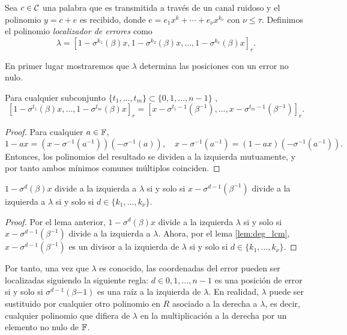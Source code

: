 Sea \(c \in \mathcal{C}\) una palabra que es transmitida a través de un canal ruidoso y el polinomio \(y = c + e\) es recibido, donde \(e = e_1 x^k + \cdots + e_\nu x^{k_\nu}\) con \(\nu \leq \tau\). Definimos el polinomio \textit{localizador de errores} como
\[
\lambda = {\left[1 - \sigma^{k_1}(\beta)x, 1 - \sigma^{k_2}(\beta)x, \dots, 1 - \sigma^{k_\nu}(\beta)x\right]}_r
.\]

En primer lugar mostraremos que \(\lambda\) determina las posiciones con un error no nulo.

\begin{lemma}\label{lem:lambda_roots}
    Para cualquier subconjunto \(\{t_1, \dots, t_m\} \subset \{0, 1, \dots, n-1\}\) ,
    \[
    {\left[1 -\sigma^{t_1}(\beta)x, \dots, 1 - \sigma^{t_m}(\beta)x \right]}_r
    = {\left[x - \sigma^{t_1 - 1}(\beta^{-1}), \dots, x - \sigma^{t_m -1}(\beta^{-1})\right]}_r
    .\]
\end{lemma}

\begin{proof}
    Para cualquier \(a \in \mathbb{F}\),
    \[
    1 - ax = (x - \sigma^{-1}(a^{-1}))(- \sigma^{-1}(a)),\quad
    x - \sigma^{-1}(a^{-1}) = (1 - ax)(-\sigma^{-1}(a^{-1})).
    \]
    Entonces, los polinomios del resultado se dividen a la izquierda mutuamente, y por tanto ambos mínimos comunes múltiplos coinciden.
\end{proof}

\begin{proposition}
\label{prop:root_error_position}
    \(1- \sigma^d(\beta)x\) divide a la izquierda a \(\lambda\) si y solo si \(x - \sigma^{d-1}(\beta^{-1})\) divide a la izquierda a  \(\lambda\) si y solo si \(d \in \{k_1, \dots, k_\nu\}\).
\end{proposition}

\begin{proof}
    Por el lema anterior, \(1 - \sigma^d(\beta)x\) divide a la izquierda \(\lambda\) si y solo si  \(x - \sigma^{d-1}(\beta^{-1})\) divide a la izquierda a \(\lambda\). Ahora, por el lema \ref{lem:deg_lcm}, \(x - \sigma^{d-1}(\beta^{-1})\) es un divisor a la izquierda de \(\lambda\) si y solo si  \(d \in \{k_1, \dots, k_\nu\}\).
\end{proof}

Por tanto, una vez que \(\lambda\) es conocido, las coordenadas del error pueden ser localizadas siguiendo la siguiente regla: \(d \in {0,1, \dots, n-1}\) es una posición de error si y solo si \(\sigma^{d-1}(\beta{-1})\) es una raíz a la izquierda de \(\lambda\). En realidad,  \(\lambda\) puede ser sustituido por cualquier otro polinomio en \(R\) asociado a la derecha a \(\lambda\), es decir, cualquier polinomio que difiera de \(\lambda\) en la multiplicación a la derecha por un elemento no nulo de \(\mathbb{F}\).


